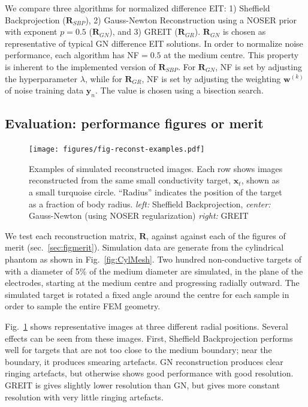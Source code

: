\documentclass[12pt]{iopart}
\newcommand{\xB}{\mbox{$\mathbf{x}$}}
\newcommand{\yB}{\mbox{$\mathbf{y}$}}
\newcommand{\wB}{\mbox{$\mathbf{w}$}}
\newcommand{\RB}{\mbox{$\mathbf{R}$}}
\begin{document}
We compare three algorithms for normalized
difference EIT:
1) Sheffield Backprojection
    ($\RB_{SBP}$), 
2) Gauss-Newton Reconstruction using a
   NOSER prior with exponent $p=0.5$
    ($\RB_{GN}$), 
and
3) GREIT ($\RB_{GR}$). 
$\RB_{GN}$ is chosen as representative
of typical GN difference EIT solutions.
 In order to normalize
noise performance, each algorithm has
NF$=0.5$ at the medium centre. This property
is inherent to the implemented version
of $\RB_{SBP}$. 
For $\RB_{GN}$, NF is set by 
adjusting the hyperparameter $\lambda$, while
for $\RB_{GR}$, NF is set by 
adjusting the weighting $\wB^{(k)}$ of noise
training data $\yB_n$. The value is chosen using
a bisection search.


\subsection{Evaluation: performance figures or merit}
\label{sec:perffigm}

\begin{figure}[bhtp]
\begin{center}
\texttt{[image: figures/fig-reconst-examples.pdf]}
\caption{
\label{fig:FoMimages}
Examples of simulated reconstructed images. Each row
shows images reconstructed from the same small 
conductivity target, $\xB_t$, shown as 
a small turquoise circle. ``Radius'' indicates
the position of the target as a fraction of body radius.
{\em left:} Sheffield Backprojection,
{\em center:} Gauss-Newton (using NOSER regularization)
{\em right:} GREIT
}
\end{center}
\end{figure}

We test each reconstruction matrix, $\RB$,
against against each of the figures of merit 
(sec.\ \ref{sec:figmerit}). Simulation data
are generate from the cylindrical phantom
as shown in Fig.\ \ref{fig:CylMesh}. 
Two hundred 
non-conductive targets of with a diameter of
5\% of the medium diameter are simulated,
 in the plane of the electrodes,
starting at the medium centre and 
progressing radially outward. The simulated 
target is rotated a fixed angle around the centre
for each sample in order to sample the entire
FEM geometry.

Fig.\ \ref{fig:FoMimages} shows representative
images at three different radial positions.
Several effects can be seen from these images.
First, Sheffield Backprojection performs well
for targets that are not too close to the 
medium boundary; near the boundary, it produces
smearing artefacts. GN reconstruction produces
clear ringing artefacts, but otherwise shows
good performance with good resolution. 
GREIT is gives slightly lower resolution than
GN, but gives more constant resolution with
very little ringing artefacts.
\end{document}
